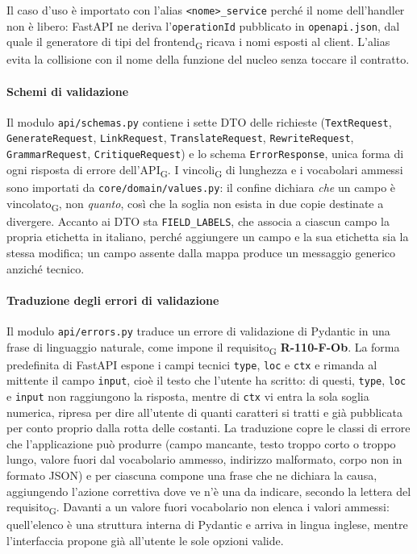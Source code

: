 \documentclass[a4paper, 10pt]{article}
\begin{document}
Il caso d'uso è importato con l'alias \texttt{<nome>\_service} perché il nome dell'handler non è libero: FastAPI ne deriva l'\texttt{operationId} pubblicato in \texttt{openapi.json}, dal quale il generatore di tipi del frontend\textsubscript{G} ricava i nomi esposti al client. L'alias evita la collisione con il nome della funzione del nucleo senza toccare il contratto.

\paragraph{Schemi di validazione}
Il modulo \texttt{api/schemas.py} contiene i sette DTO delle richieste (\texttt{TextRequest}, \texttt{GenerateRequest}, \texttt{LinkRequest}, \texttt{TranslateRequest}, \texttt{RewriteRequest}, \texttt{GrammarRequest}, \texttt{CritiqueRequest}) e lo schema \texttt{ErrorResponse}, unica forma di ogni risposta di errore dell'API\textsubscript{G}. I vincoli\textsubscript{G} di lunghezza e i vocabolari ammessi sono importati da \texttt{core/domain/values.py}: il confine dichiara \textit{che} un campo è vincolato\textsubscript{G}, non \textit{quanto}, così che la soglia non esista in due copie destinate a divergere. Accanto ai DTO sta \texttt{FIELD\_LABELS}, che associa a ciascun campo la propria etichetta in italiano, perché aggiungere un campo e la sua etichetta sia la stessa modifica; un campo assente dalla mappa produce un messaggio generico anziché tecnico.

\paragraph{Traduzione degli errori di validazione}
Il modulo \texttt{api/errors.py} traduce un errore di validazione di Pydantic in una frase di linguaggio naturale, come impone il requisito\textsubscript{G} \textbf{R-110-F-Ob}. La forma predefinita di FastAPI espone i campi tecnici \texttt{type}, \texttt{loc} e \texttt{ctx} e rimanda al mittente il campo \texttt{input}, cioè il testo che l'utente ha scritto: di questi, \texttt{type}, \texttt{loc} e \texttt{input} non raggiungono la risposta, mentre di \texttt{ctx} vi entra la sola soglia numerica, ripresa per dire all'utente di quanti caratteri si tratti e già pubblicata per conto proprio dalla rotta delle costanti. La traduzione copre le classi di errore che l'applicazione può produrre (campo mancante, testo troppo corto o troppo lungo, valore fuori dal vocabolario ammesso, indirizzo malformato, corpo non in formato JSON) e per ciascuna compone una frase che ne dichiara la causa, aggiungendo l'azione correttiva dove ve n'è una da indicare, secondo la lettera del requisito\textsubscript{G}. Davanti a un valore fuori vocabolario non elenca i valori ammessi: quell'elenco è una struttura interna di Pydantic e arriva in lingua inglese, mentre l'interfaccia propone già all'utente le sole opzioni valide.
\end{document}
